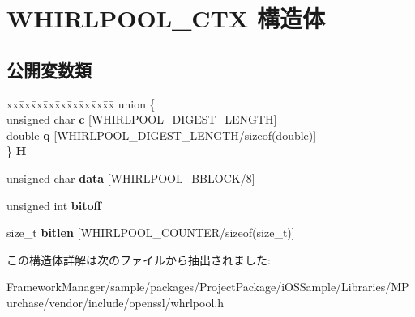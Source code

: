 \hypertarget{struct_w_h_i_r_l_p_o_o_l___c_t_x}{}\section{W\+H\+I\+R\+L\+P\+O\+O\+L\+\_\+\+C\+T\+X 構造体}
\label{struct_w_h_i_r_l_p_o_o_l___c_t_x}
\subsection*{公開変数類}
\begin{DoxyCompactItemize}
\item 
\hypertarget{struct_w_h_i_r_l_p_o_o_l___c_t_x_ab193e73467e6942d32e9aeeaf5b97d25}{}\begin{tabbing}
xx\=xx\=xx\=xx\=xx\=xx\=xx\=xx\=xx\=\kill
union \{\\
\>unsigned char {\bfseries c} \mbox{[}WHIRLPOOL\_DIGEST\_LENGTH\mbox{]}\\
\>double {\bfseries q} \mbox{[}WHIRLPOOL\_DIGEST\_LENGTH/sizeof(double)\mbox{]}\\
\} {\bfseries H}\label{struct_w_h_i_r_l_p_o_o_l___c_t_x_ab193e73467e6942d32e9aeeaf5b97d25}
\\

\end{tabbing}\item 
\hypertarget{struct_w_h_i_r_l_p_o_o_l___c_t_x_ab580a848108e15b30239c9374c53caa7}{}unsigned char {\bfseries data} \mbox{[}W\+H\+I\+R\+L\+P\+O\+O\+L\+\_\+\+B\+B\+L\+O\+C\+K/8\mbox{]}\label{struct_w_h_i_r_l_p_o_o_l___c_t_x_ab580a848108e15b30239c9374c53caa7}

\item 
\hypertarget{struct_w_h_i_r_l_p_o_o_l___c_t_x_a9af51a2a30f80139879b0f8a52ef08f0}{}unsigned int {\bfseries bitoff}\label{struct_w_h_i_r_l_p_o_o_l___c_t_x_a9af51a2a30f80139879b0f8a52ef08f0}

\item 
\hypertarget{struct_w_h_i_r_l_p_o_o_l___c_t_x_acdb67c455ec2f1ecd07e27e8419b03e0}{}size\+\_\+t {\bfseries bitlen} \mbox{[}W\+H\+I\+R\+L\+P\+O\+O\+L\+\_\+\+C\+O\+U\+N\+T\+E\+R/sizeof(size\+\_\+t)\mbox{]}\label{struct_w_h_i_r_l_p_o_o_l___c_t_x_acdb67c455ec2f1ecd07e27e8419b03e0}

\end{DoxyCompactItemize}


この構造体詳解は次のファイルから抽出されました\+:\begin{DoxyCompactItemize}
\item 
Framework\+Manager/sample/packages/\+Project\+Package/i\+O\+S\+Sample/\+Libraries/\+M\+Purchase/vendor/include/openssl/whrlpool.\+h\end{DoxyCompactItemize}
